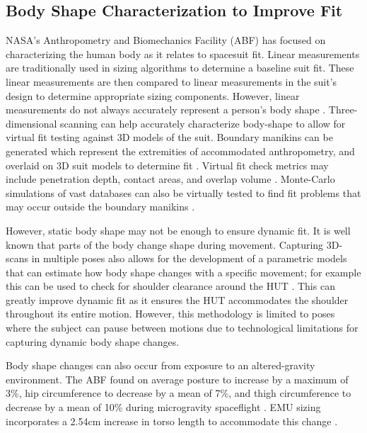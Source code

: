 \documentclass[defaultstyle,11pt]{comps}
\begin{document}
\hypertarget{body-shape-characterization-to-improve-fit}{%
\subsection{Body Shape Characterization to Improve Fit}\label{body-shape-characterization-to-improve-fit}}

NASA's Anthropometry and Biomechanics Facility (ABF) has focused on characterizing the human body as it relates to spacesuit fit.
Linear measurements are traditionally used in sizing algorithms to determine a baseline suit fit.
These linear measurements are then compared to linear measurements in the suit's design to determine appropriate sizing components.
However, linear measurements do not always accurately represent a person's body shape \citep{Margerum2010}.
Three-dimensional scanning can help accurately characterize body-shape to allow for virtual fit testing against 3D models of the suit.
Boundary manikins can be generated which represent the extremities of accommodated anthropometry, and overlaid on 3D suit models to determine fit \citep{Margerum2010}.
Virtual fit check metrics may include penetration depth, contact areas, and overlap volume \citep{Kim2019}.
Monte-Carlo simulations of vast databases can also be virtually tested to find fit problems that may occur outside the boundary manikins \citep{Kim2019}.

However, static body shape may not be enough to ensure dynamic fit.
It is well known that parts of the body change shape during movement.
Capturing 3D-scans in multiple poses also allows for the development of a parametric models that can estimate how body shape changes with a specific movement; for example this can be used to check for shoulder clearance around the HUT \citep{Kim2016}.
This can greatly improve dynamic fit as it ensures the HUT accommodates the shoulder throughout its entire motion.
However, this methodology is limited to poses where the subject can pause between motions due to technological limitations for capturing dynamic body shape changes.

Body shape changes can also occur from exposure to an altered-gravity environment.
The ABF found on average posture to increase by a maximum of 3\%, hip circumference to decrease by a mean of 7\%, and thigh circumference to decrease by a mean of 10\% during microgravity spaceflight \citep{Kim2019}.
EMU sizing incorporates a 2.54cm increase in torso length to accommodate this change \citep{Thornton1987}.
\end{document}
